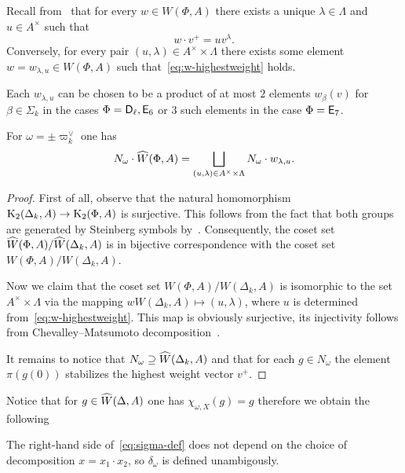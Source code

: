 Recall from~\cite[Lemma~6]{V00} that for every $w \in W(\Phi, A)$ there exists a unique $\lambda \in \Lambda$ and $u \in A^\times $ such that
 \begin{equation}\label{eq:w-highestweight} w \cdot v^+ = u v^\lambda. \end{equation}
Conversely, for every pair $(u, \lambda) \in A^\times \times \Lambda$ there exists some element $w = w_{\lambda, u} \in W(\Phi, A)$ such that~\eqref{eq:w-highestweight} holds.
\begin{rem} Each $w_{\lambda, u}$ can be chosen to be a product of at most $2$ elements $w_\beta(v)$ for $\beta\in\Sigma_k$ in the cases $\Phi = \mathsf{D}_\ell, \mathsf{E}_6$ or $3$ such elements in the case $\Phi = \mathsf{E}_7$. \end{rem}

\begin{lemma} \label{lem:can-repr}
  For $\omega = \pm \varpi_k^\vee$ one has \[N_{\omega} \cdot \widehat{W}(\Phi, A) = \bigsqcup\limits_{(u, \lambda) \in A^\times \times \Lambda} N_{\omega} \cdot w_{\lambda, u}. \]
\end{lemma}
\begin{proof}
  First of all, observe that the natural homomorphism $\operatorname{K}_2(\Delta_k, A) \to \operatorname{K}_2(\Phi, A)$ is surjective.
  This follows from the fact that both groups are generated by Steinberg symbols by~\cite[Theorem~2.5]{Ste73}.
  Consequently, the coset set $\widehat{W}(\Phi, A) / \widehat{W}(\Delta_k, A)$ is in bijective correspondence with the coset set $W(\Phi, A)/W(\Delta_k, A)$.

  Now we claim that the coset set $W(\Phi, A)/W(\Delta_k, A)$ is isomorphic to the set $A^\times \times \Lambda$
   via the mapping $w W(\Delta_k, A) \mapsto (u, \lambda)$, where $u$ is determined from~\eqref{eq:w-highestweight}.
  This map is obviously surjective, its injectivity follows from Chevalley--Matsumoto decomposition~\cite[Theorem~1.3]{St78}.

  It remains to notice that $N_{\omega} \supseteq \widehat{W}(\Delta_k, A)$ and that for each $g \in N_{\omega}$ the element $\pi(g(0))$ stabilizes the highest weight vector $v^+$.
\end{proof}

Notice that for $g \in \widehat{W}(\Delta, A)$ one has $\chi_{\omega, X}(g) = g$ therefore we obtain the following
\begin{cor}
 The right-hand side of~\eqref{eq:sigma-def} does not depend on the choice of decomposition $x = x_1 \cdot x_2$, so $\delta_\omega$ is defined unambigously.
\end{cor}

